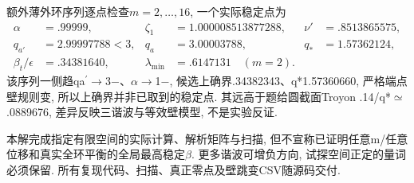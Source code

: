 \begin{solution}
额外薄外环序列逐点检查$m=2,\ldots,16$, 一个实际稳定点为
\begin{align}
 \alpha&=.99999,& \zeta_1&=1.000008513877288,&\nu'&=.8513865575,\\
 q_{a'}&=2.99997788<3,&q_a&=3.00003788,&q_*&=1.57362124,\\
 \beta_t/\epsilon&=.34381640,&\lambda_{\min}&=.6147131\quad(m=2).&&
\end{align}
 该序列一侧趋qa\ensuremath{{}^{\prime}}\ensuremath{\to}3\ensuremath{-}、\ensuremath{\alpha}\ensuremath{\to}1\ensuremath{-}, 候选上确界.34382343、q*1.57360660, 严格端点壁规则变, 所以上确界并非已取到的稳定点. 其远高于题给圆截面Troyon .14/q*\ensuremath{\simeq}.0889676, 差异反映三谐波与等效壁模型, 不是实验反证.

本解完成指定有限空间的实际计算、解析矩阵与扫描, 但不宣称已证明任意m/任意位移和真实全环平衡的全局最高稳定\ensuremath{\beta}. 更多谐波可增负方向, 试探空间正定的量词必须保留. 所有复现代码、扫描、真正零点及壁跳变CSV随源码交付.
\end{solution}
